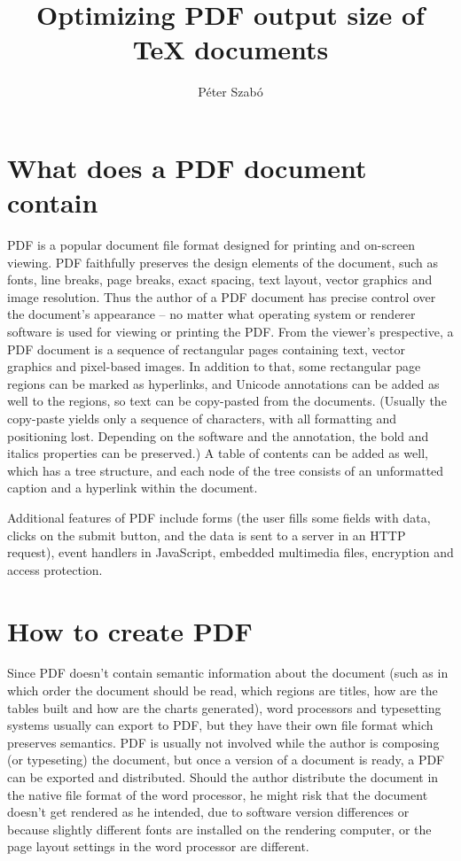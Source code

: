 \documentclass{ltugproc}
\author{P\'eter Szab\'o}
\title{Optimizing PDF output size of \TeX{} documents}
\begin{document}
\maketitle

\section{What does a PDF document contain}

PDF is a popular document file format designed for printing and on-screen
viewing. PDF faithfully preserves the design elements of the document, such
as fonts, line breaks, page breaks, exact spacing, text layout, vector
graphics and image resolution. Thus the author of a PDF document has precise
control over the document's appearance -- no matter what operating system or
renderer software is used for viewing or printing the PDF. From the viewer's
prespective, a PDF document is a sequence of rectangular pages containing
text, vector graphics and pixel-based images. In addition to that, some
rectangular page regions can be marked as hyperlinks, and Unicode
annotations can be added as well to the regions, so text can be copy-pasted
from the documents. (Usually the copy-paste yields only a sequence of
characters, with all formatting and positioning lost. Depending on the
software and the annotation, the bold and italics properties can be
preserved.) A table of contents can be added as well, which has a tree
structure, and each node of the tree consists of an unformatted caption and
a hyperlink within the document.

Additional features of PDF include forms (the user fills some fields with
data, clicks on the submit button, and the data is sent to a server in an
HTTP request), event handlers in JavaScript, embedded multimedia files,
encryption and access protection.

\section{How to create PDF}

Since PDF doesn't contain semantic information about the document (such as
in which order the document should be read, which regions are titles, how
are the tables built and how are the charts generated), word processors and
typesetting systems usually can export to PDF, but they have their own file
format which preserves semantics. PDF is usually not involved while the
author is composing (or typeseting) the document, but once a version of a
document is ready, a PDF can be exported and distributed. Should the author
distribute the document in the native file format of the word processor, he
might risk that the document doesn't get rendered as he intended, due to
software version differences or because slightly different fonts are
installed on the rendering computer, or the page layout settings in the word
processor are different.
\end{document}
